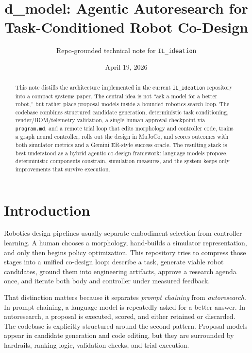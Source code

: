 \documentclass[10pt,letterpaper,twocolumn]{article}
\title{\textbf{d\_model: Agentic Autoresearch for Task-Conditioned Robot Co-Design}}
\author{Repo-grounded technical note for \texttt{IL\_ideation}}
\date{April 19, 2026}
\begin{document}
\maketitle

\begin{abstract}
This note distills the architecture implemented in the current \texttt{IL\_ideation} repository into a compact systems paper. The central idea is not ``ask a model for a better robot,'' but rather place proposal models inside a bounded robotics search loop. The codebase combines structured candidate generation, deterministic task conditioning, render/BOM/telemetry validation, a single human approval checkpoint via \texttt{program.md}, and a remote trial loop that edits morphology and controller code, trains a graph neural controller, rolls out the design in MuJoCo, and scores outcomes with both simulator metrics and a Gemini ER-style success oracle. The resulting stack is best understood as a hybrid agentic co-design framework: language models propose, deterministic components constrain, simulation measures, and the system keeps only improvements that survive execution.
\end{abstract}

\section{Introduction}

Robotics design pipelines usually separate embodiment selection from controller learning. A human chooses a morphology, hand-builds a simulator representation, and only then begins policy optimization. This repository tries to compress those stages into a unified co-design loop: describe a task, generate viable robot candidates, ground them into engineering artifacts, approve a research agenda once, and iterate both body and controller under measured feedback.

That distinction matters because it separates \emph{prompt chaining} from \emph{autoresearch}. In prompt chaining, a language model is repeatedly asked for a better answer. In autoresearch, a proposal is executed, scored, and either retained or discarded. The codebase is explicitly structured around the second pattern. Proposal models appear in candidate generation and code editing, but they are surrounded by hardrails, ranking logic, validation checks, and trial execution.
\end{document}
